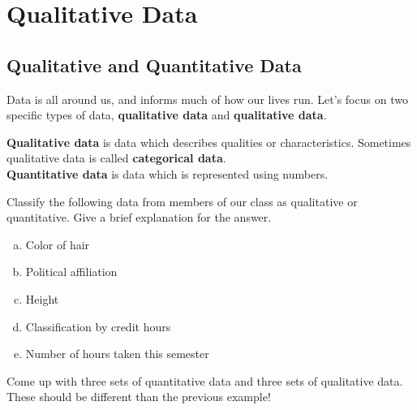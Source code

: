\documentclass[notes]{subfiles}
\begin{document}
	\setcounter{section}{1}
	\setcounter{page}{1}
	\fancyhead[LO,RE]{\bfseries \currentname}
	\fancyfoot[C]{{}}
	\fancyfoot[RO,LE]{\large \thepage}	%

\section*{Qualitative Data}\label{qualdata}
	\subsection*{Qualitative and Quantitative Data}	
		Data is all around us, and informs much of how our lives run.  Let's focus on two specific types of data, \textbf{qualitative data} and \textbf{qualitative data}.

		\begin{defn}
			\textbf{Qualitative data} is data which describes qualities or characteristics.  Sometimes qualitative data is called \textbf{categorical data}.\\[15pt]
	
			\textbf{Quantitative data} is data which is represented using numbers.
		\end{defn}
		
		\begin{ex}
			Classify the following data from members of our class as qualitative or quantitative.  Give a brief explanation for the answer.
			\begin{enumerate}[(a)]
				\item Color of hair
	
				\item Political affiliation
	
				\item Height
	
				\item Classification by credit hours
	
				\item Number of hours taken this semester
			\end{enumerate}
		\end{ex}
			\newpage
	
		\begin{ex}
			Come up with three sets of quantitative data and three sets of qualitative data.  These should be different than the previous example!
		\end{ex}
\end{document}
